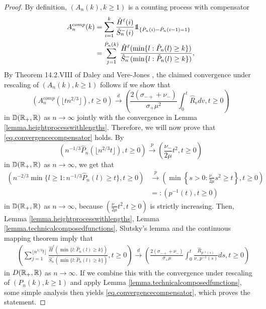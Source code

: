 \begin{proof}
By definition, $(A_n(k),k\geq 1)$ is a counting process with compensator 
\begin{align*}
    A_n^{comp}(k)&=\sum_{i=1}^k \frac{\hat{H}^\ell(i)}{\hat{S}^-_n(i)}\one_{\{\hat{P}_n(i)-\hat{P}_n(i-1)=1\}}\\
    &=\sum_{j=1}^{\hat{P}_n(k)}\frac{\hat{H}^\ell(\min\{l:\hat{P}_n(l)\geq k\})}{\hat{S}^-_n(\min\{l:\hat{P}_n(l)\geq k\})},
\end{align*}
 By Theorem 14.2.VIII of Daley and Vere-Jones \cite{daleyIntroductionTheoryPoint2008}, the claimed convergence under rescaling of $(A_n(k),k\geq 1)$ follows if we show that 
\begin{equation}\label{eq.convergencecompensator}
    \left(A_n^{comp}\left(\lfloor tn^{2/3}\rfloor \right), t\geq 0\right)\overset{d}{\to}\left(\frac{2(\sigma_{-+}+\nu_-)}{\sigma_+\mu^2} \int_0^t\hat{R}_v dv, t \geq 0\right)
\end{equation}
in ${\mathbb D}({\mathbb R}_+,{\mathbb R})$ as $n\to \infty$ jointly with the convergence in Lemma \ref{lemma.heightprocesswithlengths}. Therefore, we will now prove that \eqref{eq.convergencecompensator} holds. 
By
$$\left(n^{-1/3}\hat{P}_n\left(\lfloor n^{2/3}t\rfloor \right),t\geq 0\right)\overset{p}{\to}\left(\frac{\nu_-}{2\mu}t^2,t\geq 0\right)$$
in ${\mathbb D}({\mathbb R}_+,{\mathbb R})$ as $n\to \infty$,
we get that
\begin{align*}\left(n^{-2/3}\min\{l\geq 1:n^{-1/3}\hat{P}_n(l)\geq t\},t\geq 0\right)&\overset{p}{\to}\left(\min\left\{s>0: \frac{\nu_-}{2\mu}s^2\geq t\right \}, t\geq 0\right)\\
&=:\left(p^{-1}(t),t\geq 0\right) \end{align*}
in ${\mathbb D}({\mathbb R}_+,{\mathbb R})$ as $n\to \infty$, because $\left(\frac{\nu_-}{2\mu}t^2,t\geq 0\right)$ is strictly increasing. Then, Lemma \ref{lemma.heightprocesswithlengths}, Lemma \ref{lemma.technicalcomposedfunctions}, Slutsky's lemma and the continuous mapping theorem imply that 
\begin{align*}&\left(\sum_{j=1}^{\lfloor n^{1/3}t\rfloor}\frac{\hat{H}^\ell(\min\{l:\hat{P}_n(l)\geq k\})}{\hat{S}^-_n(\min\{l:\hat{P}_n(l)\geq k\})},t\geq 0\right)\overset{d}{\to} \left( \frac{2(\sigma_{-+}+\nu_-)}{\sigma_+\mu} \int_0^t \frac{\hat{R}_{p^{-1}(s)}}{\nu_- p^{-1}(s)}ds,t\geq 0 \right)
\end{align*}
in $D({\mathbb R}_+,{\mathbb R})$ as $n\to\infty$. If we combine this with the convergence under rescaling of $(P_n(k),k\geq 1)$ and apply Lemma \ref{lemma.technicalcomposedfunctions}, some simple analysis then yields \eqref{eq.convergencecompensator}, which proves the statement.
\end{proof}

